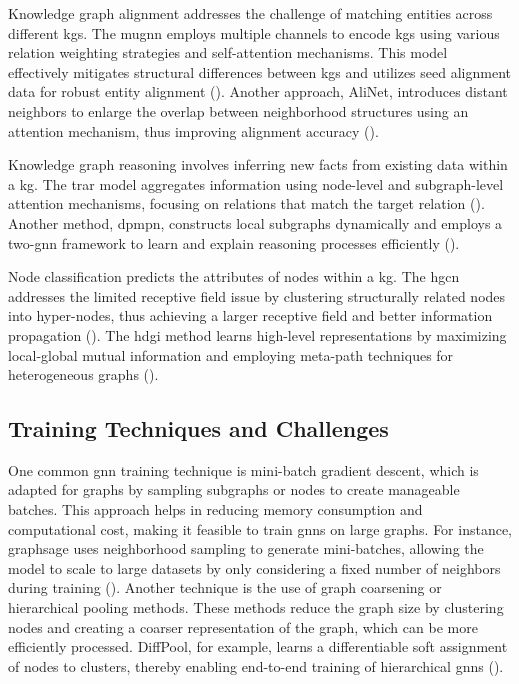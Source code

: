 Knowledge graph alignment addresses the challenge of matching entities across different \glspl{kg}.
The \gls{mugnn} employs multiple channels to encode \glspl{kg} using various relation weighting strategies and self-attention mechanisms.
This model effectively mitigates structural differences between \glspl{kg} and utilizes seed alignment data for robust entity alignment (\cite{Cao2019}).
Another approach, AliNet, introduces distant neighbors to enlarge the overlap between neighborhood structures using an attention mechanism, thus improving alignment accuracy (\cite{Sun2019}).

Knowledge graph reasoning involves inferring new facts from existing data within a \gls{kg}.
The \gls{trar} model aggregates information using node-level and subgraph-level attention mechanisms, focusing on relations that match the target relation (\cite{Zhao2021}).
Another method, \gls{dpmpn}, constructs local subgraphs dynamically and employs a two-\gls{gnn} framework to learn and explain reasoning processes efficiently (\cite{Xu2019}).

Node classification predicts the attributes of nodes within a \gls{kg}.
The \gls{hgcn} addresses the limited receptive field issue by clustering structurally related nodes into hyper-nodes, thus achieving a larger receptive field and better information propagation (\cite{Hu2019}).
The \gls{hdgi} method learns high-level representations by maximizing local-global mutual information and employing meta-path techniques for heterogeneous graphs (\cite{Ren2019}).

\subsection*{Training Techniques and Challenges}
One common \gls{gnn} training technique is mini-batch gradient descent, which is adapted for graphs by sampling subgraphs or nodes to create manageable batches.
This approach helps in reducing memory consumption and computational cost, making it feasible to train \glspl{gnn} on large graphs.
For instance, \gls{graphsage} uses neighborhood sampling to generate mini-batches, allowing the model to scale to large datasets by only considering a fixed number of neighbors during training (\cite{Hamilton2017}).
Another technique is the use of graph coarsening or hierarchical pooling methods. These methods reduce the graph size by clustering nodes and creating a coarser representation of the graph, which can be more efficiently processed.
DiffPool, for example, learns a differentiable soft assignment of nodes to clusters, thereby enabling end-to-end training of hierarchical \glspl{gnn} (\cite{Ying2018}).

